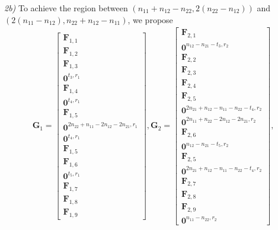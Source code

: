 \documentclass[12pt, draftclsnofoot, onecolumn]{IEEEtran}
\theoremstyle{definition}
\begin{document}
\emph{2b)} To achieve the region between $(n_{11}+n_{12} - n_{22},2(n_{22}-n_{12}))$ and $(2(n_{11}-n_{12}),n_{22}+n_{12}-n_{11})$, we propose
\begin{align}\label{eq:ex_two_align}
\boldsymbol{G}_1 = \begin{bmatrix}
\boldsymbol{F}_{1,1}\\
\boldsymbol{F}_{1,2} \\
\boldsymbol{F}_{1,3} \\
\boldsymbol{0}^{t_3,r_1}\\
\boldsymbol{F}_{1,4} \\
\boldsymbol{0}^{t_4,r_1}\\
\boldsymbol{F}_{1,5} \\
\boldsymbol{0}^{2n_{22}+n_{11}-2n_{12}-2n_{21},r_1}\\
\boldsymbol{0}^{t_4,r_1}\\
\boldsymbol{F}_{1,5} \\
\boldsymbol{F}_{1,6} \\
\boldsymbol{0}^{t_5,r_1}\\
\boldsymbol{F}_{1,7} \\
\boldsymbol{F}_{1,8}\\
\boldsymbol{F}_{1,9}
\end{bmatrix},
\boldsymbol{G}_2 = \begin{bmatrix}
\boldsymbol{F}_{2,1} \\
\boldsymbol{0}^{n_{12}-n_{21}-t_3,r_2} \\
\boldsymbol{F}_{2,2} \\
\boldsymbol{F}_{2,3} \\
\boldsymbol{F}_{2,4} \\
\boldsymbol{F}_{2,5} \\
\boldsymbol{0}^{2n_{21}+n_{12}-n_{11}-n_{22}-t_4,r_2} \\
\boldsymbol{0}^{2n_{11}+n_{22}-2n_{12}-2n_{21},r_2} \\
\boldsymbol{F}_{2,6} \\
\boldsymbol{0}^{n_{12}-n_{21}-t_5,r_2}\\
\boldsymbol{F}_{2,5} \\
\boldsymbol{0}^{2n_{21}+n_{12}-n_{11}-n_{22}-t_4,r_2} \\
\boldsymbol{F}_{2,7} \\
\boldsymbol{F}_{2,8} \\
\boldsymbol{F}_{2,9} \\
\boldsymbol{0}^{n_{11}-n_{22},r_2}
\end{bmatrix},
\end{align}
\end{document}
